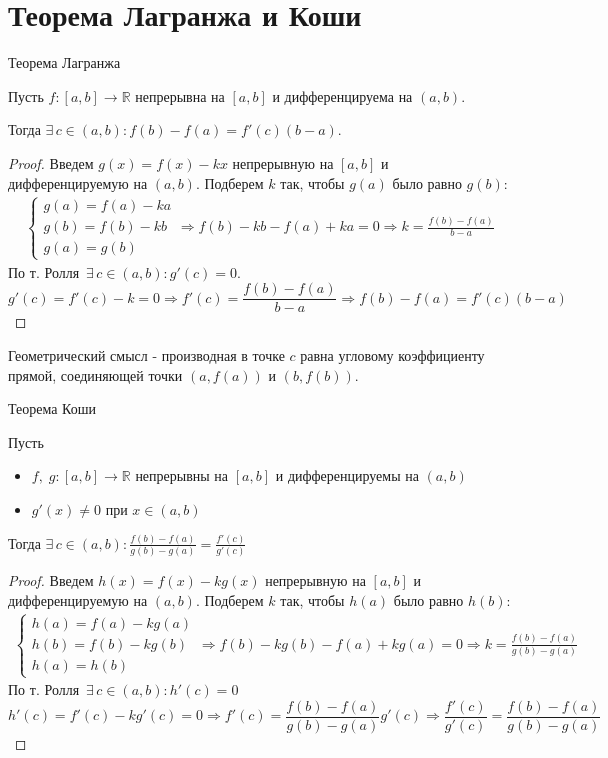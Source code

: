 \section{Теорема Лагранжа и Коши}
\begin{theorem-non}
    Теорема Лагранжа

    Пусть $f: [a, b] \to \mathbb{R}$ непрерывна на $[a, b]$ и дифференцируема на $(a, b)$.

    Тогда $\exists \, c \in (a, b) : f(b) - f(a) = f'(c)(b - a)$.
\end{theorem-non}
\begin{proof}
    Введем $g(x) = f(x) - kx$ непрерывную на $[a, b]$ и дифференцируемую на $(a, b)$. Подберем $k$ так, чтобы $g(a)$ было равно $g(b)$:
    \begin{gather*}
        \begin{cases}
            g(a) = f(a) - ka \\
            g(b) = f(b) - kb \\
            g(a) = g(b)
        \end{cases} 
        \Rightarrow f(b) - kb - f(a) + ka = 0 \Rightarrow k = \frac{f(b) - f(a)}{b - a}
    \end{gather*}
    По т. Ролля $ \, \exists \, c \in (a, b) : g'(c) = 0$.
    \[ g'(c) = f'(c) - k = 0 \Rightarrow f'(c) = \frac{f(b) - f(a)}{b - a} \Rightarrow f(b) - f(a) = f'(c)(b - a) \]
\end{proof}
\begin{notice}
     Геометрический смысл - производная в точке $c$ равна угловому коэффициенту прямой, 
     соединяющей точки $(a, f(a))$ и $(b, f(b))$.
\end{notice}

\begin{theorem-non}
    Теорема Коши

    Пусть
    \begin{itemize}
        \item $f, \; g: [a, b] \to \mathbb{R}$ непрерывны на $[a, b]$ и дифференцируемы на $(a, b)$
        \item $g'(x) \neq 0$ при $x \in (a, b)$
    \end{itemize}
    Тогда $\exists \, c \in (a, b) : \frac{f(b) - f(a)}{g(b) - g(a)} = \frac{f'(c)}{g'(c)}$
\end{theorem-non}
\begin{proof}
    Введем $h(x) = f(x) - kg(x)$ непрерывную на $[a, b]$ и дифференцируемую на $(a, b)$. Подберем $k$ так, чтобы $h(a)$ было равно $h(b)$:
    \begin{gather*}
        \begin{cases}
            h(a) = f(a) - kg(a) \\
            h(b) = f(b) - kg(b) \\
            h(a) = h(b)
        \end{cases} 
        \Rightarrow f(b) - kg(b) - f(a) + kg(a) = 0 \Rightarrow k = \frac{f(b) - f(a)}{g(b) - g(a)}
    \end{gather*}
    По т. Ролля $\, \exists \, c \in (a, b): h'(c) = 0$
    \[ h'(c) = f'(c) - kg'(c) = 0 \Rightarrow f'(c) = \frac{f(b) - f(a)}{g(b) - g(a)} g'(c) \Rightarrow \frac{f'(c)}{g'(c)} = \frac{f(b) - f(a)}{g(b) - g(a)} \]
\end{proof}